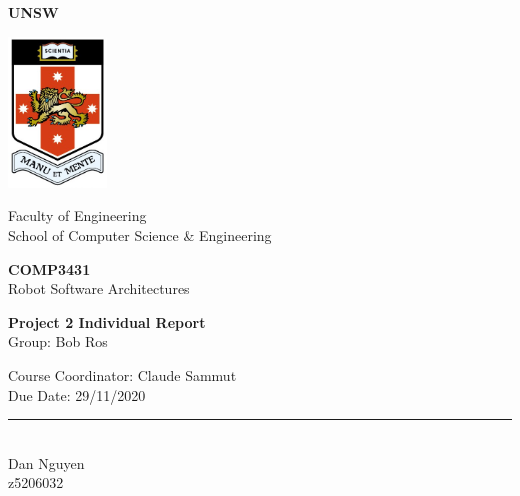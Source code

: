 \documentclass[11pt]{article}
\begin{document}

\onehalfspacing
\begin{titlepage}
    \begin{center}
        \Huge
        \textbf{UNSW} \\

        \vspace{5mm}

        \includegraphics[height=4cm]{unsw-logo.jpg}

        \vspace{5mm}

        \Large
        Faculty of Engineering \\
        School of Computer Science \& Engineering \\

        \vspace{10mm}

        \textbf{COMP3431} \\
        Robot Software Architectures \\

        \vspace{15mm}

        \LARGE
        \textbf{Project 2 Individual Report} \\
        
        \Large
        Group: Bob Ros

        \vspace{15mm}

        \Large
        Course Coordinator: Claude Sammut\\
        Due Date: 29/11/2020 \\

        \vfill
        \rule{\linewidth}{0.5pt} \\

        \Large
        Dan Nguyen \\

        \large
        z5206032 \\

    \end{center}
\end{titlepage}
\end{document}
